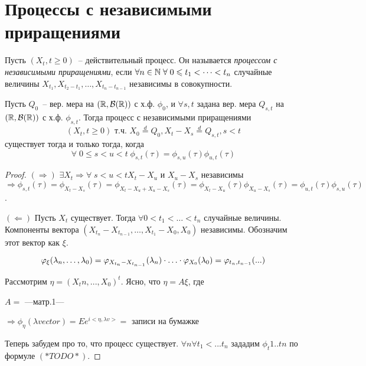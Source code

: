 \section{Процессы с независимыми приращениями}
\begin{definition}
Пусть $(X_t, t \geq 0)$~-- действительный процесс. Он называется \emph{процессом с
независимыми приращениями}, если $\forall n \in \mathbb{N} \; \forall \; 0 \leqslant t_1 < \dots < t_n$
случайные величины $X_{t_1}, X_{t_2 - t_1}, \dots, X_{t_n - t_{n-1}}$ независимы в совокупности.
\end{definition}

\begin{theorem}
Пусть $Q_0$~-- вер. мера на $(\mathbb{R}, \mathcal{B}(\mathbb{R}))$ с х.ф. $\phi_0$,
и $\forall s,t$ задана вер. мера $Q_{s,t}$ на $(\mathbb{R}, \mathcal{B}(\mathbb{R}))$ с х.ф. $\phi_{s,t}$.
Тогда процесс с независимыми приращениями
$$(X_t, t \geq 0) \text{ т.ч. } X_0 \overset{d}{=} Q_0, X_t - X_s \overset{d}{=} Q_{s,t}, s < t$$
существует тогда и только тогда, когда
$$\forall \; 0 \leq s < u < t \; \phi_{s,t}(\tau) = \phi_{s,u}(\tau) \phi_{u,t}(\tau)$$
\end{theorem}
\begin{proof} \forcenewline
$(\Rightarrow)$ $\exists X_t \Rightarrow \forall \; s < u < t X_t-X_u$ и
$X_u-X_s$ независимы $\Rightarrow \phi_{s,t}(\tau) = \phi_{X_t-X_s}(\tau)=
\phi_{X_t-X_u+X_u-X_s}(\tau) =
\phi_{X_t-X_u}(\tau) \phi_{X_u-X_s}(\tau) =
\phi_{u,t}(\tau) \phi_{s,u}(\tau)$.

$(\Leftarrow)$ Пусть $X_t$ существует. Тогда $\forall 0 < t_1 < \dots < t_n$
случайные величины. Компоненты вектора $(X_{t_n}-X_{t_{n-1}}, \dots, X_{t_1}-X_0, X_0)$
независимы. Обозначим этот вектор как $\xi$.

$$\varphi_\xi(\lambda_{n}, \dots, \lambda_{0}) =
\varphi_{X_{t_n}-X_{t_{n-1}}}(\lambda_n) \cdot \ldots \cdot \varphi_{X_0}(\lambda_0) =
\varphi_{t_n,t_{n-1}}(...)$$

Рассмотрим $\eta = (X_tn, ..., X_0)^t$. Ясно,  что $\eta = A\xi$, где

$A = $ ---матр.1---

$\Rightarrow \phi_\eta(\lambda vector) = Ee^{i <\eta, \lambda v>} = $
записи на бумажке

Теперь забудем про то, что процесс существует.
$\forall n \forall t_1 < ... t_n$ зададим $\phi_t1..tn$ по формуле $(*TODO*)$.
%
%
%
%
%
%
\end{proof}

